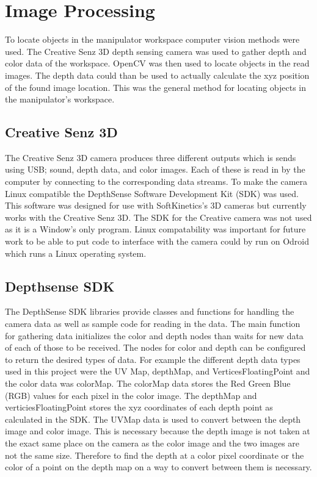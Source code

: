 \chapter{Image Processing}
To locate objects in the manipulator workspace computer vision methods were used. The Creative Senz 3D depth sensing camera was used to gather depth and color data of the workspace. OpenCV was then used to locate objects in the read images. The depth data could than be used to actually calculate the xyz position of the found image location. This was the general method for locating objects in the manipulator's workspace.

\section{Creative Senz 3D}
The Creative Senz 3D camera produces three different outputs which is sends using USB; sound, depth data, and color images. Each of these is read in by the computer by connecting to the corresponding data streams. To make the camera Linux compatible the DepthSense Software Development Kit (SDK) was used. This software was designed for use with SoftKinetics's 3D cameras but currently works with the Creative Senz 3D. The SDK for the Creative camera was not used as it is a Window's only program. Linux compatability was important for future work to be able to put code to interface with the camera could by run on Odroid which runs a Linux operating system. 

\section{Depthsense SDK}
The DepthSense SDK libraries provide classes and functions for handling the camera data as well as sample code for reading in the data. The main function for gathering data initializes the color and depth nodes than waits for new data of each of those to be received. The nodes for color and depth can be configured to return the desired types of data. For example the different depth data types used in this project were the UV Map, depthMap, and VerticesFloatingPoint and the color data was colorMap. The colorMap data stores the Red Green Blue (RGB) values for each pixel in the color image. The depthMap and verticiesFloatingPoint stores the xyz coordinates of each depth point as calculated in the SDK. The UVMap data is used to convert between the depth image and color image. This is necessary because the depth image is not taken at the exact same place on the camera as the color image and the two images are not the same size. Therefore to find the depth at a color pixel coordinate or the color of a point on the depth map on a way to convert between them is necessary.

